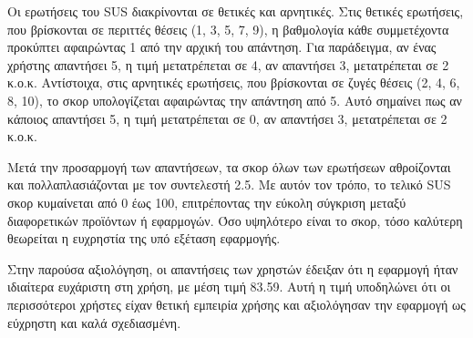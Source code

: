         Οι ερωτήσεις του SUS διακρίνονται σε θετικές και αρνητικές. Στις θετικές ερωτήσεις, που βρίσκονται σε περιττές θέσεις (1, 3, 5, 7, 9), η βαθμολογία κάθε συμμετέχοντα προκύπτει αφαιρώντας 1 από την αρχική του απάντηση. Για παράδειγμα, αν ένας χρήστης απαντήσει 5, η τιμή μετατρέπεται σε 4, αν απαντήσει 3, μετατρέπεται σε 2 κ.ο.κ. Αντίστοιχα, στις αρνητικές ερωτήσεις, που βρίσκονται σε ζυγές θέσεις (2, 4, 6, 8, 10), το σκορ υπολογίζεται αφαιρώντας την απάντηση από 5. Αυτό σημαίνει πως αν κάποιος απαντήσει 5, η τιμή μετατρέπεται σε 0, αν απαντήσει 3, μετατρέπεται σε 2 κ.ο.κ.

        Μετά την προσαρμογή των απαντήσεων, τα σκορ όλων των ερωτήσεων αθροίζονται και πολλαπλασιάζονται με τον συντελεστή 2.5. Με αυτόν τον τρόπο, το τελικό SUS σκορ κυμαίνεται από 0 έως 100, επιτρέποντας την εύκολη σύγκριση μεταξύ διαφορετικών προϊόντων ή εφαρμογών. Όσο υψηλότερο είναι το σκορ, τόσο καλύτερη θεωρείται η ευχρηστία της υπό εξέταση εφαρμογής.

        Στην παρούσα αξιολόγηση, οι απαντήσεις των χρηστών έδειξαν ότι η εφαρμογή ήταν ιδιαίτερα ευχάριστη στη χρήση, με μέση τιμή 83.59. Αυτή η τιμή υποδηλώνει ότι οι περισσότεροι χρήστες είχαν θετική εμπειρία χρήσης και αξιολόγησαν την εφαρμογή ως εύχρηστη και καλά σχεδιασμένη.